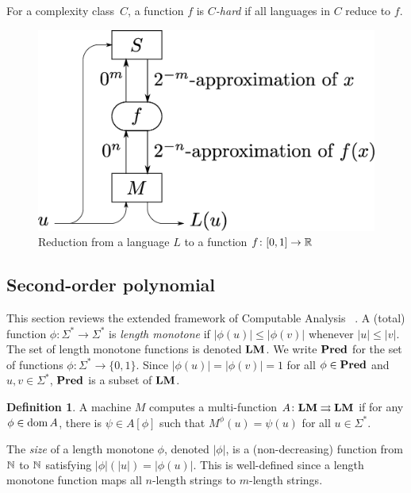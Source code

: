 \documentclass{article}
\theoremstyle{definition}
\newtheorem{definition}[theorem]{Definition}
\theoremstyle{remark}
\begin{document}
For a complexity class~$C$, a function $f$ is \emph{$C$-hard}
if all languages in $C$ reduce to $f$.

 \begin{figure}
  \begin{center}
  \includegraphics[scale=0.25]{image/reduction.eps}
  \caption{Reduction from a language $L$ to a function $f \colon [0,1] \to \mathbb R$}
  \label{fig:reduction}
  \end{center}
 \end{figure}

\subsection{Second-order polynomial}
\label{section:TTF}

This section reviews the extended framework of Computable Analysis~%
\cite{kawamura2012complexity}.
A (total) function $\phi \colon \Sigma^* \to \Sigma^*$ is \emph{length monotone}
if  $|\phi(u)| \le |\phi(v)|$ whenever $|u| \le |v|$.
The set of length monotone functions is denoted $\mathbf{LM}$.
We write $\mathbf{Pred}$ for the set of functions $\phi \colon \Sigma^* \to \{0, 1\}$.
Since $|\phi(u)| = |\phi(v)| = 1$ for all $\phi \in \mathbf{Pred}$ and $u, v \in \Sigma^*$,
$\mathbf{Pred}$ is a subset of $\mathbf{LM}$.

\begin{definition}
 A machine $M$ computes a multi-function $A \colon \mathbf{LM} \rightrightarrows \mathbf{LM}$ if for any
 $\phi \in \mathop{\rm dom} A$, there is $\psi \in A[\phi]$ such that $M^\phi(u) = \psi(u)$ for all $u \in \Sigma^*$.
\end{definition}

The \emph{size} of a length monotone $\phi$, denoted $|\phi|$,
is a (non-decreasing) function from $\mathbb N$ to $\mathbb N$ satisfying 
$|\phi|(|u|) = |\phi(u)|$.
This is well-defined since a length monotone function maps 
all $n$-length strings to $m$-length strings.
\end{document}
